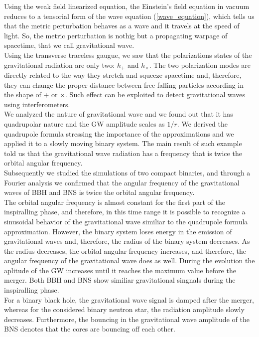 Using the weak field linearized equation, the Einstein's field equation in vacuum reduces to a tensorial form of the wave equation (\ref{wave_equation}), which tells us that the metric perturbation behaves as a wave and it travels at the speed of light.
So, the metric perturbation is nothig but a propagating warpage of spacetime, that we call gravitational wave.\\
Using the transverse traceless gaugue, we saw that the polarizations states of the gravitational radiation are only two: $h_{+}$ and $h_{\times}$.
The two polarization modes are directly related to the way they stretch and squeeze spacetime and, therefore, they can change the proper distance between free falling particles according in the shape of $+$ or $\times$.
Such effect can be exploited to detect gravitational waves using interferometers.\\
We analyzed the nature of gravitational wave  and we found out that it has quadrupolar nature and the GW amplitude scales as $1/r$.
We derived the quadrupole formula stressing the importance of the approximations and we applied it to a slowly moving binary system.
The main result of such example told us that the gravitational wave radiation has a frequency that is twice the orbital angular frequency.\\
Subsequently we studied the simulations of two compact binaries, and through a Fourier analysis we confirmed that the angular frequency of the gravitational waves of BBH and BNS is twice the orbital angular frequency.\\
The orbital angular frequency is almost constant for the first part of the inspiralling phase, and therefore, in this time range it is possible to recognize a sinusoidal behavior of the gravitational wave similiar to the quadrupole formula approximation.
However, the binary system loses energy in the emission of gravitational waves and, therefore, the radius of the binary system decreases. 
As the radius decreases, the orbital angular frequency increases, and therefore, the angular frequency of the gravitational wave does as well. 
During the evolution the aplitude of the GW increases until it reaches the maximum value before the merger.
Both BBH and BNS show similiar gravitational singnals during the inspiralling phase.\\
For a binary black hole, the gravitational wave signal is damped after the merger, whereas for the considered binary neutron star, the radiation amplitude slowly decreases.
Furthermore, the bouncing in the gravitational wave amplitude of the BNS denotes that the cores are bouncing off each other.\\
